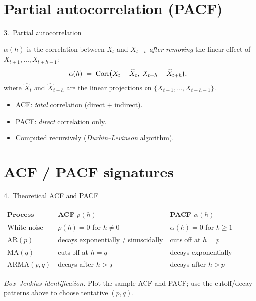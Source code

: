 \documentclass[aspectratio=169]{beamer}
\begin{document}
\section{Partial autocorrelation (PACF)}

\begin{frame}{3.~Partial autocorrelation}
  \begin{defbox}[PACF]
    $\alpha(h)$ is the correlation between $X_t$ and $X_{t+h}$
    \emph{after removing} the linear effect of $X_{t+1}, \dots, X_{t+h-1}$:
    \[
      \alpha(h) \;=\; \mathrm{Corr}\bigl(X_t - \widehat{X}_t,\; X_{t+h} - \widehat{X}_{t+h}\bigr),
    \]
    where $\widehat{X}_t$ and $\widehat{X}_{t+h}$ are the linear projections
    on $\{X_{t+1}, \dots, X_{t+h-1}\}$.
  \end{defbox}
  \medskip
  \begin{itemize}
    \item ACF: \emph{total} correlation (direct + indirect).
    \item PACF: \emph{direct} correlation only.
    \item Computed recursively (\emph{Durbin--Levinson} algorithm).
  \end{itemize}
\end{frame}

\section{ACF / PACF signatures}

\begin{frame}{4.~Theoretical ACF and PACF}
  \begin{center}
  \begin{tabular}{lll}
    \toprule
    \textbf{Process} & \textbf{ACF $\rho(h)$}             & \textbf{PACF $\alpha(h)$} \\
    \midrule
    White noise      & $\rho(h) = 0$ for $h \neq 0$       & $\alpha(h) = 0$ for $h \geq 1$ \\
    AR$(p)$          & decays exponentially / sinusoidally & cuts off at $h = p$       \\
    MA$(q)$          & cuts off at $h = q$                & decays exponentially       \\
    ARMA$(p, q)$     & decays after $h > q$               & decays after $h > p$       \\
    \bottomrule
  \end{tabular}
  \end{center}
  \medskip
  \begin{infobox}
    \emph{Box--Jenkins identification.} Plot the sample ACF and PACF;
    use the cutoff/decay patterns above to choose tentative $(p, q)$.
  \end{infobox}
\end{frame}
\end{document}
